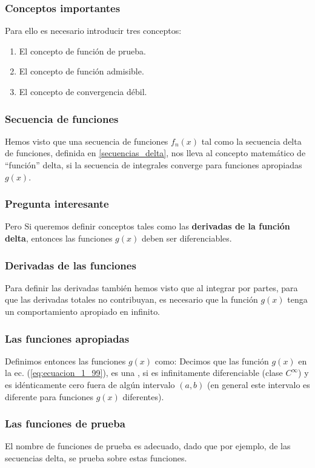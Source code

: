 \documentclass[12pt]{beamer}
\begin{document}
\begin{frame}
\frametitle{Conceptos importantes}
Para ello es necesario introducir tres conceptos:
\pause
{}
\begin{enumerate}[<+->]
\item El concepto de función de prueba.
\item El concepto de función admisible.
\item El concepto de convergencia débil.
\end{enumerate}
\end{frame}

\begin{frame}
\frametitle{Secuencia de funciones}
Hemos visto que una secuencia de funciones $f_{n} (x)$ tal como la secuencia delta de funciones, definida en \ref{secuencias_delta}, \pause nos lleva al concepto matemático de \enquote{función} delta, si la secuencia de integrales converge para funciones apropiadas $g (x)$.
\end{frame}

\begin{frame}
\frametitle{Pregunta interesante}
Pero 
\pause
Si queremos definir conceptos tales como las \textbf{derivadas de la función delta}, entonces las funciones $g (x)$ deben ser diferenciables.
\end{frame}

\begin{frame}
\frametitle{Derivadas de las funciones}
Para definir las derivadas también hemos visto que al integrar por partes, para que las derivadas totales no contribuyan, es necesario que la función $g (x)$ tenga un comportamiento apropiado en infinito.
\end{frame}

\begin{frame}
\frametitle{Las funciones apropiadas}
Definimos entonces las funciones $g (x)$ como:
\pause
Decimos que las función $g (x)$ en la ec. (\ref{eq:ecuacion_1_99}), es una , si es infinitamente diferenciable (clase $C^{\infty}$) y es idénticamente cero fuera de algún intervalo $(a, b)$ (en general este intervalo es diferente para funciones $g (x)$ diferentes).
\end{frame}

\begin{frame}
\frametitle{Las funciones de prueba}
El nombre de funciones de prueba es adecuado, dado que por ejemplo,  de las secuencias delta, se prueba sobre estas funciones.
\end{frame}
\end{document}
